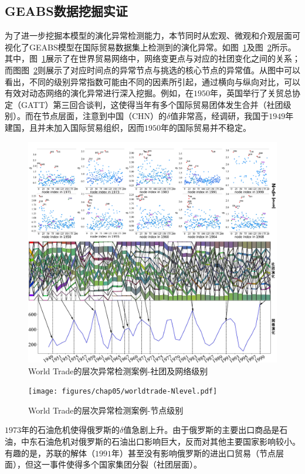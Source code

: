 \subsection{GEABS数据挖掘实证}

为了进一步挖掘本模型的演化异常检测能力，本节同时从宏观、微观和介观层面可视化了GEABS模型在国际贸易数据集上检测到的演化异常。如图~\ref{fig:worldtradecaseCN}及图~\ref{fig:worldtradecaseN}所示。其中，图~\ref{fig:worldtradecaseCN}展示了在世界贸易网络中，网络变更点与对应的社团变化之间的关系；而图图~\ref{fig:worldtradecaseN}则展示了对应时间点的异常节点与挑选的核心节点的异常值。从图中可以看出，不同的级别异常指数可能由不同的因素所引起，通过横向与纵向对比，可以有效对动态网络的演化异常进行深入挖掘。例如，在$1950$年，英国举行了关贸总协定（GATT）第三回合谈判，这使得当年有多个国际贸易团体发生合并（社团级别）。而在节点层面，注意到中国（CHN）的$\delta$值非常高，经调研，我国于$1949$年建国，且并未加入国际贸易组织，因而$1950$年的国际贸易并不稳定。

\begin{figure}
	\centering
	\includegraphics[width=\textwidth]{figures/chap05/worldtrade-CNlevel.pdf}
	\caption{World Trade的层次异常检测案例-社团及网络级别}
	\label{fig:worldtradecaseCN}
	\vspace{-2cm}
\end{figure}

\begin{figure}
	\centering
	\texttt{[image: figures/chap05/worldtrade-Nlevel.pdf]}
	\caption{World Trade的层次异常检测案例-节点级别}
	\label{fig:worldtradecaseN}
\end{figure}
$1973$年的石油危机使得俄罗斯的$\delta$值急剧上升。由于俄罗斯的主要出口商品是石油，中东石油危机对俄罗斯的石油出口影响巨大，反而对其他主要国家影响较小。有趣的是，苏联的解体（$1991$年）甚至没有影响俄罗斯的进出口贸易（节点层面），但这一事件使得多个国家集团分裂（社团层面）。


